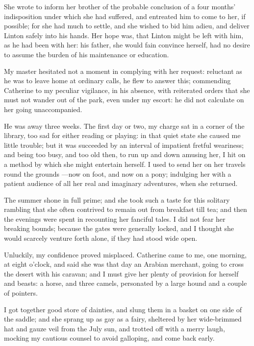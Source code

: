 \par She wrote to inform her brother of the probable conclusion of a four months' indisposition under which she had suffered, and entreated him to come to her, if possible; for she had much to settle, and she wished to bid him adieu, and deliver Linton safely into his hands. Her hope was, that Linton might be left with him, as he had been with her: his father, she would fain convince herself, had no desire to assume the burden of his maintenance or education.
\par My master hesitated not a moment in complying with her request: reluctant as he was to leave home at ordinary calls, he flew to answer this; commending Catherine to my peculiar vigilance, in his absence, with reiterated orders that she must not wander out of the park, even under my escort: he did not calculate on her going unaccompanied.
\par He was away three weeks. The first day or two, my charge sat in a corner of the library, too sad for either reading or playing: in that quiet state she caused me little trouble; but it was succeeded by an interval of impatient fretful weariness; and being too busy, and too old then, to run up and down amusing her, I hit on a method by which she might entertain herself. I used to send her on her travels round the grounds —now on foot, and now on a pony; indulging her with a patient audience of all her real and imaginary adventures, when she returned.
\par The summer shone in full prime; and she took such a taste for this solitary rambling that she often contrived to remain out from breakfast till tea; and then the evenings were spent in recounting her fanciful tales. I did not fear her breaking bounds; because the gates were generally locked, and I thought she would scarcely venture forth alone, if they had stood wide open.
\par Unluckily, my confidence proved misplaced. Catherine came to me, one morning, at eight o'clock, and said she was that day an Arabian merchant, going to cross the desert with his caravan; and I must give her plenty of provision for herself and beasts: a horse, and three camels, personated by a large hound and a couple of pointers.
\par I got together good store of dainties, and slung them in a basket on one side of the saddle; and she sprang up as gay as a fairy, sheltered by her wide-brimmed hat and gauze veil from the July sun, and trotted off with a merry laugh, mocking my cautious counsel to avoid galloping, and come back early.
